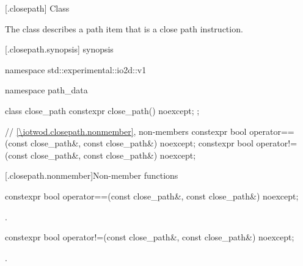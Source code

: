  [\iotwod.closepath] {Class }%

\pnum
{}
The class  describes a path item that is a close path instruction.

 [\iotwod.closepath.synopsis] { synopsis}%

\begin{codeblock}
namespace std::experimental::io2d::v1 {
  namespace path_data {
    class close_path {
      constexpr close_path() noexcept;
    };
    
    // \ref{\iotwod.closepath.nonmember}, non-members
    constexpr bool operator==(const close_path&, const close_path&) noexcept;
    constexpr bool operator!=(const close_path&, const close_path&) noexcept;
  }
}
\end{codeblock}

 [\iotwod.closepath.nonmember]{Non-member functions}%

%
\begin{itemdecl}
constexpr bool operator==(const close_path&, const close_path&) noexcept;
\end{itemdecl}
\begin{itemdescr}
\pnum
\returns
{}.
\end{itemdescr}

%
\begin{itemdecl}
constexpr bool operator!=(const close_path&, const close_path&) noexcept;
\end{itemdecl}
\begin{itemdescr}
\pnum
\returns
{}.
\end{itemdescr}
